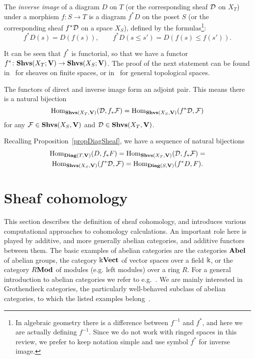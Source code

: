\begin{defin}\label{defInverseImage}
The \emph{inverse image} of a diagram $D$ on $T$ (or the corresponding sheaf $\mathcal{D}$ on $X_T$) under a morphism $f\colon S\to T$ is
a diagram $f^*D$ on the poset $S$ (or the corresponding sheaf $f^*\mathcal{D}$ on a space $X_S$), defined by the formulas\footnote{In algebraic geometry there is a difference between $f^{-1}$ and $f^*$, and here we are actually defining $f^{-1}$. Since we do not work with ringed spaces in this review, we prefer to keep notation simple and use symbol $f^*$ for inverse image.}:
\[
f^*D(s)=D(f(s)),\qquad f^*D(s\leq s')=D(f(s)\leq f(s')).
\]
\end{defin}

It can be seen that $f^*$ is functorial, so that we have a functor $f^*\colon\mathbf{Shvs}(X_T;\mathbf{V})\to \mathbf{Shvs}(X_S;\mathbf{V})$. The proof of the next statement can be found in~\cite[Theorem 5.3.1]{Curry} for sheaves on finite spaces, or in~\cite[Theorem 4.8]{Iversen} for general topological spaces.

\begin{prop}\label{propAdjointPair}
The functors of direct and inverse image form an adjoint pair. This means there is a natural bijection
\[
\operatorname{Hom}_{\mathbf{Shvs}(X_T,\mathbf{V})}(\mathcal{D},f_*\mathcal{F})=\operatorname{Hom}_{\mathbf{Shvs}(X_S,\mathbf{V})}(f^*\mathcal{D},\mathcal{F})
\]
for any $\mathcal{F}\in\mathbf{Shvs}(X_S,\mathbf{V})$ and $\mathcal{D}\in\mathbf{Shvs}(X_T,\mathbf{V})$.
\end{prop}

Recalling Proposition~\ref{propDiagSheaf}, we have a sequence of natural bijections
\begin{multline}\label{eqAllBijections}
\operatorname{Hom}_{\mathbf{Diag}(T,\mathbf{V})}(D,f_*F)=\operatorname{Hom}_{\mathbf{Shvs}(X_T,\mathbf{V})}(\mathcal{D},f_*\mathcal{F})=\\
\operatorname{Hom}_{\mathbf{Shvs}(X_S,\mathbf{V})}(f^*\mathcal{D},\mathcal{F})=\operatorname{Hom}_{\mathbf{Diag}(S,\mathbf{V})}(f^*D,F).
\end{multline}



\section{Sheaf cohomology}\label{secMathCohomology}

This section describes the definition of sheaf cohomology, and introduces various computational approaches to cohomology calculations. An important role here is played by additive, and more generally abelian categories, and additive functors between them. The basic examples of abelian categories are the categories $\mathbf{Abel}$ of abelian groups, the category $\Bbbk\mathbf{Vect}$ of vector spaces over a field $\Bbbk$, or the category $R\mathbf{Mod}$ of modules (e.g. left modules) over a ring $R$. For a general introduction to abelian categories we refer to e.g.~\cite{GelMan}. We are mainly interested in Grothendieck categories, the particularly well-behaved subclass of abelian categories, to which the listed examples belong~\cite[Ch.5,-9]{BucurDeleanu}.



